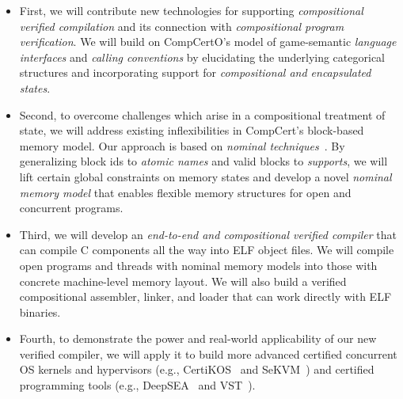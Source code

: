 \begin{itemize} \itemsep 0pt
\item First, we will contribute new technologies for supporting {\em
  compositional verified compilation} and its connection with {\em
  compositional program verification}. 
  We will build on CompCertO's model of
  game-semantic {\em language interfaces} and {\em calling conventions}
  by elucidating the underlying categorical structures
  and incorporating support for {\em compositional and encapsulated states}.
\item Second, to overcome challenges which arise
  in a compositional treatment of state,
  we will address existing inflexibilities
  in CompCert's block-based memory model.
  Our approach is based on \emph{nominal
  techniques}~\cite{pitts-nominal,gabby2002}. By generalizing block
  ids to {\em atomic names} and valid blocks to {\em supports},
  we will lift certain global constraints on memory states and develop a
  novel {\em nominal memory model} that enables flexible memory
  structures for open and concurrent programs.
\item Third, we will develop an {\em end-to-end and compositional
  verified compiler} that can compile C components all the way into
  ELF object files. We will compile open programs and threads with
  nominal memory models into those with concrete machine-level memory
  layout. We will also build a verified compositional assembler,
  linker, and loader that can work directly with ELF binaries.
\item Fourth, to demonstrate the power and real-world applicability of
  our new verified compiler, we will apply it to build more advanced
  certified concurrent OS kernels and hypervisors (e.g., CertiKOS~\cite{certikos-osdi16}
  and SeKVM~\cite{sekvm21a,sekvm21b,tao21}) and certified programming tools
    (e.g., DeepSEA~\cite{deepsea19} and VST~\cite{appel11:vst}).
\end{itemize}
